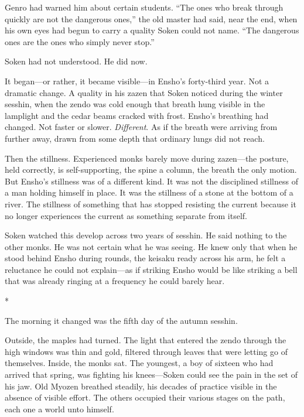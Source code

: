 Genro had warned him about certain students. ``The ones who break through quickly are not the dangerous ones,'' the old master had said, near the end, when his own eyes had begun to carry a quality Soken could not name. ``The dangerous ones are the ones who simply never stop.''

Soken had not understood. He did now.

It began---or rather, it became visible---in Ensho's forty-third year. Not a dramatic change. A quality in his zazen that Soken noticed during the winter sesshin, when the zendo was cold enough that breath hung visible in the lamplight and the cedar beams cracked with frost. Ensho's breathing had changed. Not faster or slower. \emph{Different}. As if the breath were arriving from further away, drawn from some depth that ordinary lungs did not reach.

Then the stillness. Experienced monks barely move during zazen---the posture, held correctly, is self-supporting, the spine a column, the breath the only motion. But Ensho's stillness was of a different kind. It was not the disciplined stillness of a man holding himself in place. It was the stillness of a stone at the bottom of a river. The stillness of something that has stopped resisting the current because it no longer experiences the current as something separate from itself.

Soken watched this develop across two years of sesshin. He said nothing to the other monks. He was not certain what he was seeing. He knew only that when he stood behind Ensho during rounds, the keisaku ready across his arm, he felt a reluctance he could not explain---as if striking Ensho would be like striking a bell that was already ringing at a frequency he could barely hear.

\begin{center}
*\quad*\quad*
\end{center}

The morning it changed was the fifth day of the autumn sesshin.

Outside, the maples had turned. The light that entered the zendo through the high windows was thin and gold, filtered through leaves that were letting go of themselves. Inside, the monks sat. The youngest, a boy of sixteen who had arrived that spring, was fighting his knees---Soken could see the pain in the set of his jaw. Old Myozen breathed steadily, his decades of practice visible in the absence of visible effort. The others occupied their various stages on the path, each one a world unto himself.

